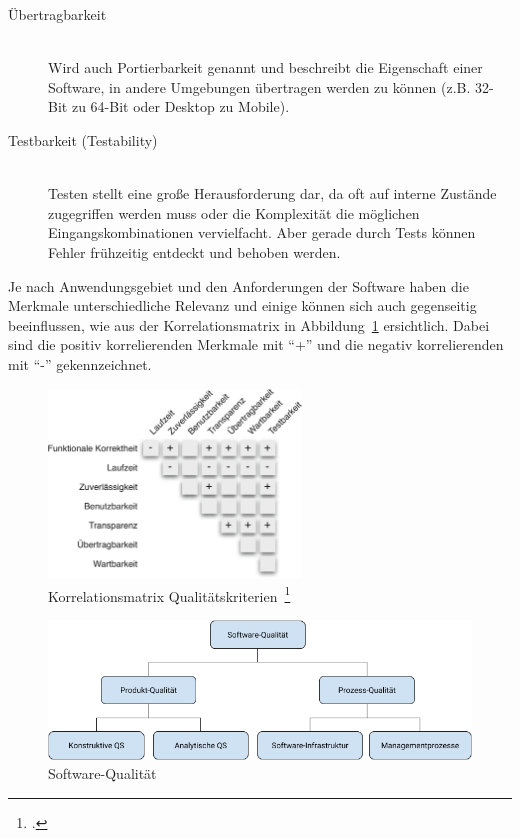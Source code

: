 \begin{description}
\begin{description}
    \item[Übertragbarkeit] \hfill \\ Wird auch Portierbarkeit genannt und beschreibt die Eigenschaft einer Software, in andere Umgebungen übertragen werden zu können (z.B. 32-Bit zu 64-Bit oder Desktop zu Mobile).
    \item[Testbarkeit (Testability)] \hfill \\ Testen stellt eine große Herausforderung dar, da oft auf interne Zustände zugegriffen werden muss oder die Komplexität die möglichen Eingangskombinationen vervielfacht. Aber gerade durch Tests können Fehler frühzeitig entdeckt und behoben werden.
  \end{description}
\end{description}

Je nach Anwendungsgebiet und den Anforderungen der Software haben die Merkmale unterschiedliche Relevanz und einige können sich auch gegenseitig beeinflussen, wie aus der Korrelationsmatrix in Abbildung~\ref{fig:korrelationsmatrix} ersichtlich.
Dabei sind die positiv korrelierenden Merkmale mit ``+'' und die negativ korrelierenden mit ``-'' gekennzeichnet.

\begin{savenotes}
  \begin{figure}[H] 
    \centering
       \includegraphics[width=0.6\textwidth]{img/korrelationsmatrix-kriterien.png}
    \caption[Korrelationsmatrix Qualitätskriterien]{Korrelationsmatrix Qualitätskriterien~\footcite[][S. 11, Abb. 1.3]{hoffmann_software_qualitat_2013}}\label{fig:korrelationsmatrix}
  \end{figure}
\end{savenotes}

\begin{savenotes}
  \begin{figure}[H] 
    \centering
       \includegraphics[width=1.0\textwidth]{img/software-quality.png}
    \caption[Software-Qualität]{Software-Qualität}\label{fig:software-quality}
  \end{figure}
\end{savenotes}

